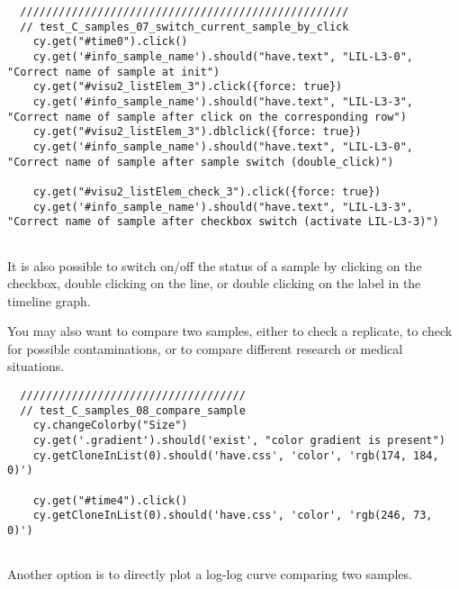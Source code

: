\begin{verbatim}
  ///////////////////////////////////////////////////
  // test_C_samples_07_switch_current_sample_by_click
    cy.get("#time0").click()
    cy.get('#info_sample_name').should("have.text", "LIL-L3-0", "Correct name of sample at init")
    cy.get("#visu2_listElem_3").click({force: true})
    cy.get('#info_sample_name').should("have.text", "LIL-L3-3", "Correct name of sample after click on the corresponding row")
    cy.get("#visu2_listElem_3").dblclick({force: true})
    cy.get('#info_sample_name').should("have.text", "LIL-L3-0", "Correct name of sample after sample switch (double_click)")

    cy.get("#visu2_listElem_check_3").click({force: true})
    cy.get('#info_sample_name').should("have.text", "LIL-L3-3", "Correct name of sample after checkbox switch (activate LIL-L3-3)")


\end{verbatim}
It is also possible to switch on/off the status of a sample by clicking on the checkbox, double clicking on the line, or double clicking on the label in the timeline graph.

\bigskip

You may also want to compare two samples, either to check a replicate, to check for possible contaminations, or to
compare different research or medical situations.

\begin{verbatim}
  ///////////////////////////////////
  // test_C_samples_08_compare_sample
    cy.changeColorby("Size")
    cy.get('.gradient').should('exist', "color gradient is present")
    cy.getCloneInList(0).should('have.css', 'color', 'rgb(174, 184, 0)')

    cy.get("#time4").click()
    cy.getCloneInList(0).should('have.css', 'color', 'rgb(246, 73, 0)')


\end{verbatim}

Another option is to directly plot a log-log curve comparing two samples.

